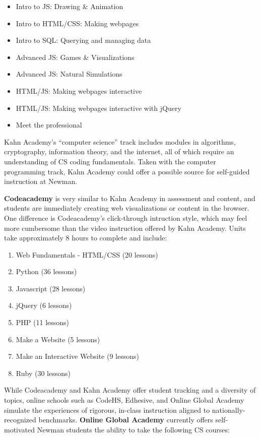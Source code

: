 \begin{itemize}
	\item Intro to JS: Drawing \& Animation
	\item Intro to HTML/CSS: Making webpages
	\item Intro to SQL: Querying and managing data
	\item Advanced JS: Games \& Visualizations
	\item Advanced JS: Natural Simulations
	\item HTML/JS: Making webpages interactive
	\item HTML/JS: Making webpages interactive with jQuery
	\item Meet the professional
\end{itemize}
Kahn Academy's ``computer science'' track includes modules in algorithms, cryptography, information theory, and the internet, all of which require an understanding of CS coding fundamentals. Taken with the computer programming track, Kahn Academy could offer a possible source for self-guided instruction at Newman. \par
\textbf{Codeacademy} is very similar to Kahn Academy in assessment and content, and students are immediately creating web visualizations or content in the browser. One difference is Codeacademy's click-through intruction style, which may feel more cumbersome than the video instruction offered by Kahn Academy. Units take approximately 8 hours to complete and include:
\begin{enumerate}
	\item Web Fundamentals - HTML/CSS (20 lessons)
	\item Python (36 lessons)
	\item Javascript (28 lessons)
	\item jQuery (6 lessons)
	\item PHP (11 lessons)
	\item Make a Website (5 lessons)
	\item Make an Interactive Website (9 lessons)
	\item Ruby (30 lessons)
\end{enumerate}
While Codeacademy and Kahn Academy offer student tracking and a diversity of topics, online schools such as CodeHS, Edhesive, and Online Global Academy simulate the experiences of rigorous, in-class instruction aligned to nationally-recognized benchmarks. \textbf{Online Global Academy} currently offers self-motivated Newman students the ability to take the following CS courses:
